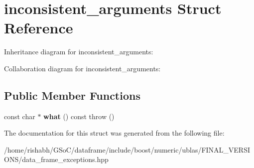 \hypertarget{structinconsistent__arguments}{}\section{inconsistent\+\_\+arguments Struct Reference}
\label{structinconsistent__arguments}


Inheritance diagram for inconsistent\+\_\+arguments\+:


Collaboration diagram for inconsistent\+\_\+arguments\+:
\subsection*{Public Member Functions}
\begin{DoxyCompactItemize}
\item 
const char $\ast$ {\bfseries what} () const   throw ()\hypertarget{structinconsistent__arguments_af4f12f8a2ad9f057548bbaaec5e5721d}{}\label{structinconsistent__arguments_af4f12f8a2ad9f057548bbaaec5e5721d}

\end{DoxyCompactItemize}


The documentation for this struct was generated from the following file\+:\begin{DoxyCompactItemize}
\item 
/home/rishabh/\+G\+So\+C/dataframe/include/boost/numeric/ublas/\+F\+I\+N\+A\+L\+\_\+\+V\+E\+R\+S\+I\+O\+N\+S/data\+\_\+frame\+\_\+exceptions.\+hpp\end{DoxyCompactItemize}
